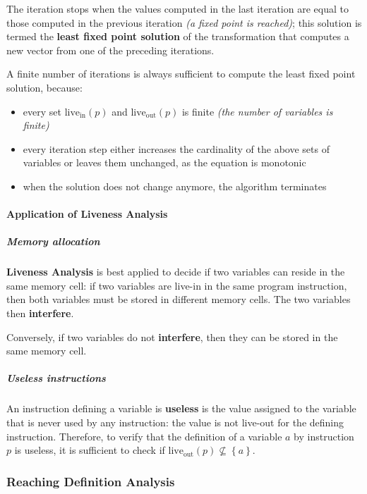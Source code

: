 \documentclass[english]{article}
\begin{document}
The iteration stops when the values computed in the last iteration are equal to those computed in the previous iteration \textit{(a fixed point is reached)};
this solution is termed the \textbf{least fixed point solution} of the transformation that computes a new vector from one of the preceding iterations.

A finite number of iterations is always sufficient to compute the least fixed point solution, because:

\begin{itemize}
  \item every set \(\text{live}_\text{in}\left( p \right)\) and \(\text{live}_\text{out}\left( p \right)\) is finite \textit{(the number of variables is finite)}
  \item every iteration step either increases the cardinality of the above sets of variables or leaves them unchanged, as the equation is monotonic
  \item when the solution does not change anymore, the algorithm terminates
\end{itemize}

\paragraph{Application of Liveness Analysis}

\subparagraph*{Memory allocation}

\textbf{Liveness Analysis} is best applied to decide if two variables can reside in the same memory cell:
if two variables are live-in in the same program instruction, then both variables must be stored in different memory cells.
The two variables then \textbf{interfere}.

Conversely, if two variables do not \textbf{interfere}, then they can be stored in the same memory cell.

\subparagraph*{Useless instructions}

An instruction defining a variable is \textbf{useless} is the value assigned to the variable that is never used by any instruction:
the value is not live-out for the defining instruction.
Therefore, to verify that the definition of a variable \(a\) by instruction \(p\) is useless, it is sufficient to check if \(\text{live}_\text{out}\left( p \right) \not\subseteq \left\{ a \right\}\).

\subsubsection{Reaching Definition Analysis}
\end{document}
